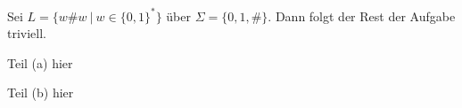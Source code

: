 Sei $L = \{w\#w\ |\ w \in \{0, 1\} ^{\ast}\}$ über $\Sigma = \{0, 1, \#\}$.
Dann folgt der Rest der Aufgabe triviell.


Teil (a) hier


Teil (b) hier
